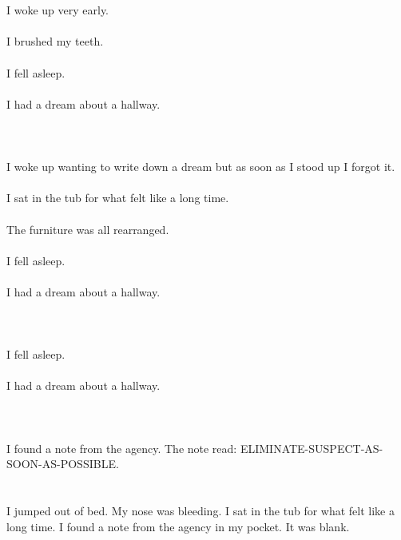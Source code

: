 \documentclass{article}
\begin{document}
    \section{}
    I woke up very early.\\\\I brushed my teeth.\\\\I fell asleep.\\\\I had a dream about a hallway.\\\\ 
    \newpage
    
    \section{}
    I woke up wanting to write down a dream but as soon as I stood up I forgot it.\\\\I sat in the tub for what felt like a long time.\\\\The furniture was all rearranged.\\\\I fell asleep.\\\\I had a dream about a hallway.\\\\ 
    \newpage
    
    \section{}
    I fell asleep.\\\\I had a dream about a hallway.\\\\ 
    \newpage
    
    \section{}
    I found a note from the agency. The note read: ELIMINATE-SUSPECT-AS-SOON-AS-POSSIBLE.  
    \newpage
    
    \section{}
    I jumped out of bed. My nose was bleeding. I sat in the tub for what felt like a long time. I found a note from the agency in my pocket. It was blank.  
    \newpage
    
\end{document}
